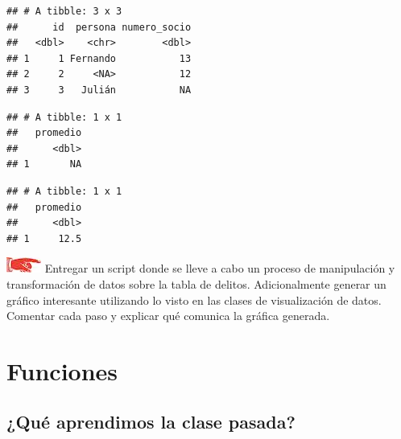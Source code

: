 \documentclass[]{book}
\newenvironment{Shaded}{\begin{snugshade}}{\end{snugshade}}
\newcommand{\KeywordTok}[1]{\textcolor[rgb]{0.13,0.29,0.53}{\textbf{#1}}}
\newcommand{\DataTypeTok}[1]{\textcolor[rgb]{0.13,0.29,0.53}{#1}}
\newcommand{\StringTok}[1]{\textcolor[rgb]{0.31,0.60,0.02}{#1}}
\newcommand{\CommentTok}[1]{\textcolor[rgb]{0.56,0.35,0.01}{\textit{#1}}}
\newcommand{\OtherTok}[1]{\textcolor[rgb]{0.56,0.35,0.01}{#1}}
\newcommand{\OperatorTok}[1]{\textcolor[rgb]{0.81,0.36,0.00}{\textbf{#1}}}
\newcommand{\NormalTok}[1]{#1}
\theoremstyle{definition}
\theoremstyle{definition}
\theoremstyle{definition}
\theoremstyle{remark}
\begin{document}
\begin{verbatim}
## # A tibble: 3 x 3
##      id  persona numero_socio
##   <dbl>    <chr>        <dbl>
## 1     1 Fernando           13
## 2     2     <NA>           12
## 3     3   Julián           NA
\end{verbatim}

\begin{Shaded}
\end{Shaded}

\begin{verbatim}
## # A tibble: 1 x 1
##   promedio
##      <dbl>
## 1       NA
\end{verbatim}

\begin{Shaded}
\end{Shaded}

\begin{verbatim}
## # A tibble: 1 x 1
##   promedio
##      <dbl>
## 1     12.5
\end{verbatim}

\includegraphics{./imagenes/manicule.jpg} Entregar un script donde se
lleve a cabo un proceso de manipulación y transformación de datos sobre
la tabla de delitos. Adicionalmente generar un gráfico interesante
utilizando lo visto en las clases de visualización de datos. Comentar
cada paso y explicar qué comunica la gráfica generada.

\chapter{Funciones}\label{funciones}

\section{¿Qué aprendimos la clase
pasada?}\label{que-aprendimos-la-clase-pasada-2}
\end{document}
